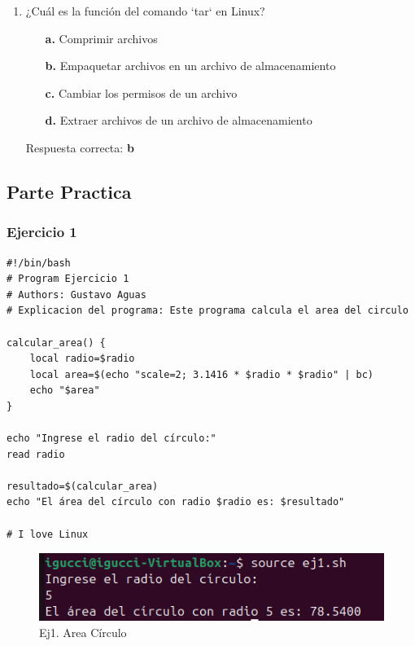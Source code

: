 \documentclass[11pt,twoside]{book}
\begin{document}
\begin{enumerate}
    \item ¿Cuál es la función del comando `tar` en Linux?
    \begin{itemize}
        \item[\textbf{a.}] Comprimir archivos
        \item[\textbf{b.}] Empaquetar archivos en un archivo de almacenamiento
        \item[\textbf{c.}] Cambiar los permisos de un archivo
        \item[\textbf{d.}] Extraer archivos de un archivo de almacenamiento
    \end{itemize}
    Respuesta correcta: \textbf{b}
    \end{enumerate}
\subsection{Parte Practica}
\subsubsection{Ejercicio 1}
\begin{lstlisting}
#!/bin/bash
# Program Ejercicio 1
# Authors: Gustavo Aguas 
# Explicacion del programa: Este programa calcula el area del circulo

calcular_area() {
    local radio=$radio
    local area=$(echo "scale=2; 3.1416 * $radio * $radio" | bc)
    echo "$area"
}

echo "Ingrese el radio del círculo:"
read radio

resultado=$(calcular_area)
echo "El área del círculo con radio $radio es: $resultado"

# I love Linux
\end{lstlisting}
\begin{figure}
    \centering
    \includegraphics[width=1\linewidth]{Ejarea.png}
    \caption{Ej1. Area Círculo}
\end{figure}

\newpage
\end{document}

